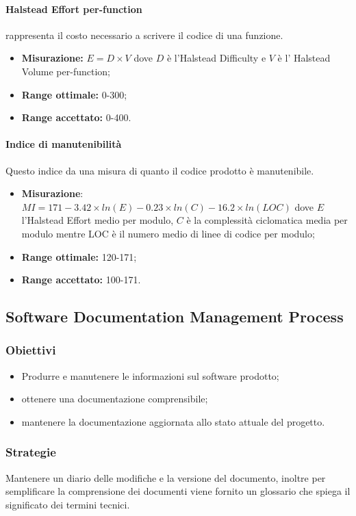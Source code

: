 			\paragraph{Halstead Effort per-function}
			rappresenta il costo necessario a scrivere il codice di una funzione.
			\begin{itemize}
				\item \textbf{Misurazione:} $E=D\times V$ dove $D$ è l'Halstead Difficulty e $V$ è l' Halstead Volume per-function;
				\item \textbf{Range ottimale:} 0-300;
				\item \textbf{Range accettato:} 0-400.
			\end{itemize}
			\paragraph{Indice di manutenibilità} 
			Questo indice da una misura di quanto il codice prodotto è manutenibile.
			\begin{itemize}
				\item \textbf{Misurazione}:$MI=171-3.42\times ln(E)-0.23\times ln(C)-16.2\times ln(LOC)$ dove $E$  l'Halstead Effort medio per modulo, $C$ è la complessità ciclomatica media per modulo mentre LOC è il numero medio di linee di codice per modulo;
				\item \textbf{Range ottimale:} 120-171;
				\item \textbf{Range accettato:} 100-171.
			\end{itemize}

	\subsection{Software Documentation Management Process}
		\subsubsection{Obiettivi}
		\begin{itemize}
			\item Produrre e manutenere le informazioni sul software prodotto;
			\item ottenere una documentazione comprensibile;
			\item mantenere la documentazione aggiornata allo stato attuale del progetto.
		\end{itemize}
		\subsubsection{Strategie}
		Mantenere un diario delle modifiche e la versione del documento, inoltre per semplificare la comprensione dei documenti viene fornito un glossario che spiega il significato dei termini tecnici. 
